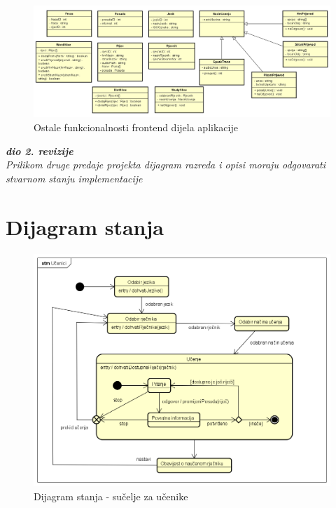 \begin{figure}[htp]
	\includegraphics[scale=0.5]{dijagrami/class_front.png}
	\centering
	\caption{Ostale funkcionalnosti frontend dijela aplikacije}
	\label{fig:class-front}
\end{figure}

\eject

			
			\textbf{\textit{dio 2. revizije}}\\			
			
			\textit{Prilikom druge predaje projekta dijagram razreda i opisi moraju odgovarati stvarnom stanju implementacije}
			
			
			
			\eject
		
		\section{Dijagram stanja}
			
			
\begin{figure}[htp]
	\includegraphics[scale=0.5]{dijagrami/state_ucenici.png}
	\centering
	\caption{Dijagram stanja - sučelje za učenike}
	\label{fig:state-ucenici}
\end{figure}

